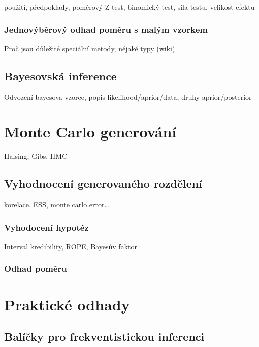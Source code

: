 \documentclass[
  11pt,
  a4paper]{report}
\begin{document}
použití, předpoklady, poměrový Z test, binomický test, síla testu,
velikost efektu

\subsection{Jednovýběrový odhad poměru s malým
vzorkem}\label{jednovuxfdbux11brovuxfd-odhad-pomux11bru-s-maluxfdm-vzorkem}

Proč jsou důležité speciální metody, nějaké typy (wiki)

\section{Bayesovská inference}\label{bayesovskuxe1-inference}

Odvození bayesova vzorce, popis likelihood/aprior/data, druhy
aprior/posterior

\chapter{Monte Carlo generování}\label{monte-carlo-generovuxe1nuxed}

Halsing, Gibs, HMC

\section{Vyhodnocení generovaného
rozdělení}\label{vyhodnocenuxed-generovanuxe9ho-rozdux11blenuxed}

korelace, ESS, monte carlo error\ldots{}

\subsection{Vyhodocení hypotéz}\label{vyhodocenuxed-hypotuxe9z}

Interval kredibility, ROPE, Bayesův faktor

\subsection{Odhad poměru}\label{odhad-pomux11bru}

\chapter{Praktické odhady}\label{praktickuxe9-odhady}

\section{Balíčky pro frekventistickou
inferenci}\label{baluxedux10dky-pro-frekventistickou-inferenci}
\end{document}
